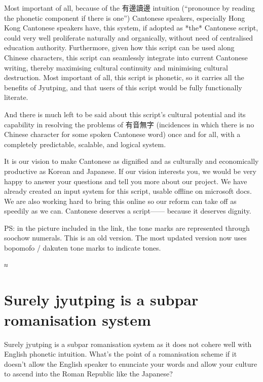 Most important of all, because of the 有邊讀邊 intuition (“pronounce by reading the phonetic component if there is one”) Cantonese speakers, especially Hong Kong Cantonese speakers have, this system, if adopted as *the* Cantonese script, could very well proliferate naturally and organically, without need of centralised education authority. Furthermore, given how this script can be used along Chinese characters, this script can seamlessly integrate into current Cantonese writing, thereby maximising cultural continuity and minimising cultural destruction. Most important of all, this script is phonetic, so it carries all the benefits of Jyutping, and that users of this script would be fully functionally literate.

And there is much left to be said about this script’s cultural potential and its capability in resolving the problems of 有音無字 (incidences in which there is no Chinese character for some spoken Cantonese word) once and for all, with a completely predictable, scalable, and logical system.

It is our vision to make Cantonese as dignified and as culturally and economically productive as Korean and Japanese. If our vision interests you, we would be very happy to answer your questions and tell you more about our project. We have already created an input system for this script, usable offline on microsoft docs. We are also working hard to bring this online so our reform can take off as speedily as we can. Cantonese deserves a script—— because it deserves dignity.

PS: in the picture included in the link, the tone marks are represented through soochow numerals. This is an old version. The most updated version now uses bopomofo / dakuten tone marks to indicate tones.

≈%




\section{Surely jyutping is a subpar romanisation system}
Surely jyutping is a subpar romanisation system as it does not cohere well with English phonetic intuition. What’s the point of a romanisation scheme if it doesn’t allow the English speaker to enunciate your words and allow your culture to ascend into the Roman Republic like the Japanese?


